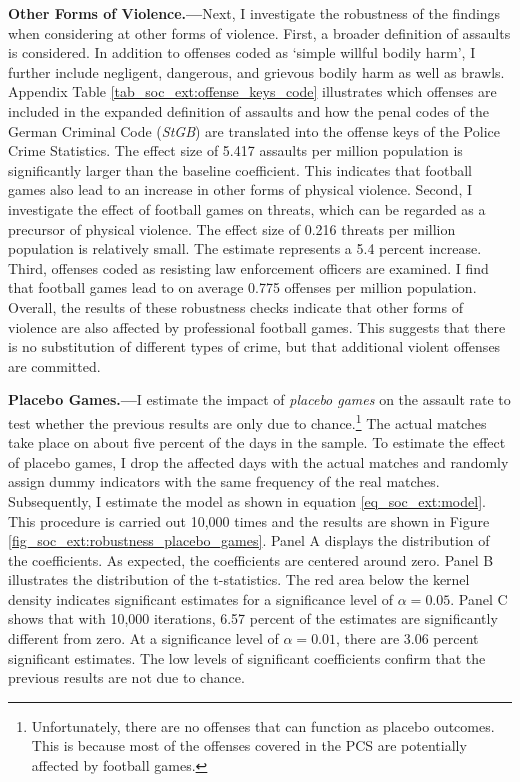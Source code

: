 
\textbf{Other Forms of Violence.---}Next, I investigate the robustness of the findings when considering at other forms of violence. First, a broader definition of assaults is considered. In addition to offenses coded as `simple willful bodily harm', I further include negligent, dangerous, and grievous bodily harm as well as brawls. Appendix Table \ref{tab_soc_ext:offense_keys_code} illustrates which offenses are included in the expanded definition of assaults and how the penal codes of the German Criminal Code (\textit{StGB}) are translated into the offense keys of the Police Crime Statistics. The effect size of 5.417 assaults per million population is significantly larger than the baseline coefficient. This indicates that football games also lead to an increase in other forms of physical violence. Second, I investigate the effect of football games on threats, which can be regarded as a precursor of physical violence. The effect size of 0.216 threats per million population is relatively small. The estimate represents a 5.4 percent increase. Third, offenses coded as resisting law enforcement officers are examined. I find that football games lead to on average 0.775 offenses per million population. Overall, the results of these robustness checks indicate that other forms of violence are also affected by professional football games. This suggests that there is no substitution of different types of crime, but that additional violent offenses are committed.\newline



\textbf{Placebo Games.---}I estimate the impact of \textit{placebo games} on the assault rate to test whether the previous results are only due to chance.\footnote{Unfortunately, there are no offenses that can function as placebo outcomes. This is because most of the offenses covered in the PCS are potentially affected by football games.} The actual matches take place on about five percent of the days in the sample. To estimate the effect of placebo games, I drop the affected days with the actual matches and randomly assign dummy indicators with the same frequency of the real matches. Subsequently, I estimate the model as shown in equation \ref{eq_soc_ext:model}. This procedure is carried out 10,000 times and the results are shown in Figure \ref{fig_soc_ext:robustness_placebo_games}. Panel A displays the distribution of the coefficients. As expected, the coefficients are centered around zero. Panel B illustrates the distribution of the t-statistics. The red area below the kernel density indicates significant estimates for a significance level of $\alpha=0.05$. Panel C shows that with 10,000 iterations, 6.57 percent of the estimates are significantly different from zero. At a significance level of $\alpha=0.01$, there are 3.06 percent significant estimates. The low levels of significant coefficients confirm that the previous results are not due to chance. 













